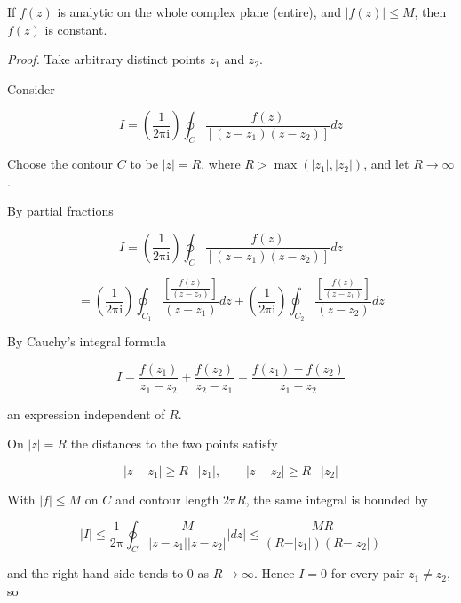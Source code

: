 \documentclass[11pt,a4paper]{article}
\theoremstyle{definition}
\theoremstyle{plain}
\begin{document}
If $f(z)$ is analytic on the whole complex plane (entire), and $\vert{}f(z)\vert{} \le M$, then $f(z)$ is constant.

\textit{Proof.} Take arbitrary distinct points $z_{1}$ and $z_{2}$.

Consider

\begin{equation}
I = \left(\frac{1}{2\mathrm{\pi}\mathrm{i}}\right)\oint_{C}\frac{f(z)}{[(z - z_{1})(z - z_{2})]}dz
\end{equation}

Choose the contour $C$ to be $\vert{}z\vert{} = R$, where $R > \max(\vert{}z_{1}\vert{}, \vert{}z_{2}\vert{})$, and let $R \to \infty$.

By partial fractions

\begin{equation}
I = \left(\frac{1}{2\mathrm{\pi}\mathrm{i}}\right)\oint_{C}\frac{f(z)}{[(z - z_{1})(z - z_{2})]}dz
\end{equation}

\[
= \left(\frac{1}{2\mathrm{\pi}\mathrm{i}}\right)\oint_{C_{1}}\frac{[\frac{f(z)}{(z - z_{2})}]}{(z - z_{1})}dz + \left(\frac{1}{2\mathrm{\pi}\mathrm{i}}\right)\oint_{C_{2}}\frac{[\frac{f(z)}{(z - z_{1})}]}{(z - z_{2})}dz
\]

By Cauchy's integral formula

\begin{equation}
I = \frac{f(z_{1})}{z_{1} - z_{2}} + \frac{f(z_{2})}{z_{2} - z_{1}}
= \frac{f(z_{1}) - f(z_{2})}{z_{1} - z_{2}}
\end{equation}

an expression independent of $R$.

On $\vert{}z\vert{} = R$ the distances to the two points satisfy

\begin{equation}
\vert{}z - z_{1}\vert{} \ge R - \vert{}z_{1}\vert{}, \qquad
\vert{}z - z_{2}\vert{} \ge R - \vert{}z_{2}\vert{}
\end{equation}

With $\vert{}f\vert{} \le M$ on $C$ and contour length $2\mathrm{\pi}R$, the same integral is
bounded by

\begin{equation}
\vert{}I\vert{} \le \frac{1}{2\mathrm{\pi}}\oint_{C}\frac{M}{\vert{}z - z_{1}\vert{}\vert{}z - z_{2}\vert{}}\vert{}dz\vert{}
\le \frac{MR}{(R - \vert{}z_{1}\vert{})(R - \vert{}z_{2}\vert{})}
\end{equation}

and the right-hand side tends to $0$ as $R \to \infty$. Hence $I = 0$ for every
pair $z_{1} \ne z_{2}$, so
\end{document}
